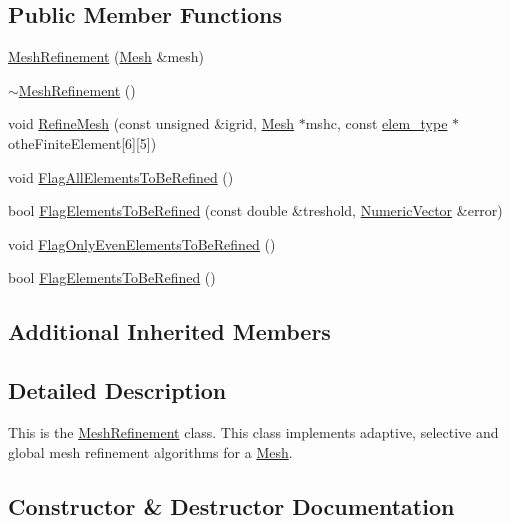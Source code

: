 \subsection*{Public Member Functions}
\begin{DoxyCompactItemize}
\item 
\mbox{\hyperlink{classfemus_1_1_mesh_refinement_afeae6cfeff611bee15b270dd88f5e024}{Mesh\+Refinement}} (\mbox{\hyperlink{classfemus_1_1_mesh}{Mesh}} \&mesh)
\item 
\mbox{\hyperlink{classfemus_1_1_mesh_refinement_ad3738fdea7f3bed9ea1ebae5e793a756}{$\sim$\+Mesh\+Refinement}} ()
\item 
void \mbox{\hyperlink{classfemus_1_1_mesh_refinement_a74f5d5b2f814b40108b0629b8d07e5a0}{Refine\+Mesh}} (const unsigned \&igrid, \mbox{\hyperlink{classfemus_1_1_mesh}{Mesh}} $\ast$mshc, const \mbox{\hyperlink{classfemus_1_1elem__type}{elem\+\_\+type}} $\ast$othe\+Finite\+Element\mbox{[}6\mbox{]}\mbox{[}5\mbox{]})
\item 
void \mbox{\hyperlink{classfemus_1_1_mesh_refinement_a64eff6dfcba6642eeccc684446d7763b}{Flag\+All\+Elements\+To\+Be\+Refined}} ()
\item 
bool \mbox{\hyperlink{classfemus_1_1_mesh_refinement_a172b0447a983f5ae30063e4bd131410c}{Flag\+Elements\+To\+Be\+Refined}} (const double \&treshold, \mbox{\hyperlink{classfemus_1_1_numeric_vector}{Numeric\+Vector}} \&error)
\item 
void \mbox{\hyperlink{classfemus_1_1_mesh_refinement_ac3ca9588354e6b993d7068d04d1c7bca}{Flag\+Only\+Even\+Elements\+To\+Be\+Refined}} ()
\item 
bool \mbox{\hyperlink{classfemus_1_1_mesh_refinement_a744be5c7ada27e69101b32f0773ea0ac}{Flag\+Elements\+To\+Be\+Refined}} ()
\end{DoxyCompactItemize}
\subsection*{Additional Inherited Members}


\subsection{Detailed Description}
This is the {\ttfamily \mbox{\hyperlink{classfemus_1_1_mesh_refinement}{Mesh\+Refinement}}} class. This class implements adaptive, selective and global mesh refinement algorithms for a {\ttfamily \mbox{\hyperlink{classfemus_1_1_mesh}{Mesh}}}. 

\subsection{Constructor \& Destructor Documentation}
\mbox{\label{classfemus_1_1_mesh_refinement_afeae6cfeff611bee15b270dd88f5e024}} 
